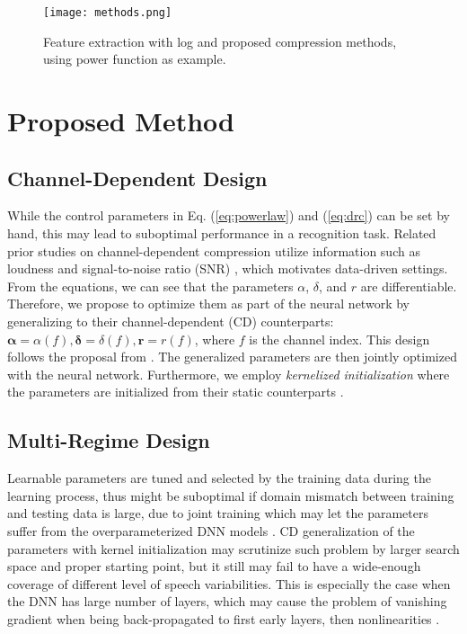 \documentclass{article}
\begin{document}
\begin{figure}
    \centering
    \texttt{[image: methods.png]}
    \caption{Feature extraction with log and proposed compression methods, using power function as example.}
\label{fig:methods}
\end{figure}

\section{Proposed Method}
\label{sec:methodology}

\subsection{Channel-Dependent Design}
\label{ssec:chandep}

While the control parameters in Eq. (\ref{eq:powerlaw}) and  (\ref{eq:drc}) can be set by hand, this may lead to suboptimal performance in a recognition task. Related prior studies on channel-dependent compression utilize information such as loudness and signal-to-noise ratio (SNR) \cite{snr_dependent_cd2}, which motivates data-driven settings. From the equations, we can see that the parameters $\alpha$, $\delta$, and $r$ are differentiable. Therefore, we propose to optimize them as part of the neural network by generalizing to their channel-dependent (CD) counterparts: $\boldsymbol{\alpha}=\alpha(f),\boldsymbol{\delta}=\delta(f), \boldsymbol{r}=r(f)$, where $f$ is the channel index. This design follows the proposal from \cite{pcen_2017}. The generalized parameters are then jointly optimized with the neural network. Furthermore, we employ \emph{kernelized initialization} where the parameters are initialized from their static counterparts \cite{learnable_mfcc2021}.

\subsection{Multi-Regime Design}
\label{ssec:multiregime}
Learnable parameters are tuned and selected by the training data during the learning process, thus might be suboptimal if domain mismatch between training and testing data is large, due to joint training which may let the parameters suffer from the overparameterized DNN models \cite{nips2020_ntk}. CD generalization of the parameters with kernel initialization may scrutinize such problem by larger search space and proper starting point, but it still may fail to have a wide-enough coverage of different level of speech variabilities. This is especially the case when the DNN has large number of layers, which may cause the problem of vanishing gradient when being back-propagated to first early layers, then nonlinearities \cite{training_dyna2020}.
\end{document}
